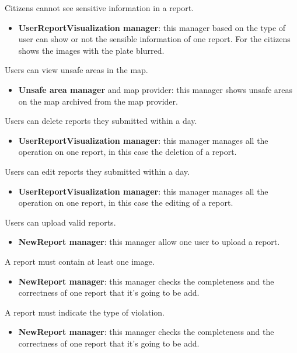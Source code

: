 \documentclass[../RASD.tex]{subfiles}
\begin{document}
\begin{enumerate}
         Citizens cannot see sensitive information in a report.
        \begin{itemize}
            \item \textbf{UserReportVisualization manager}: this manager based on the type of user can show or not the sensible information of one report.
            For the citizens shows the images with the plate blurred.
        \end{itemize}

         Users can view unsafe areas in the map.
        \begin{itemize}
            \item \textbf{Unsafe area manager} and map provider: this manager shows unsafe areas on the map archived from the map provider.
        \end{itemize}

         Users can delete reports they submitted within a day.
        \begin{itemize}
            \item \textbf{UserReportVisualization manager}: this manager manages all the operation on one report, in this case the deletion of a report.
        \end{itemize}

         Users can edit reports they submitted within a day.
        \begin{itemize}
            \item \textbf{UserReportVisualization manager}: this manager manages all the operation on one report, in this case the editing of a report.
        \end{itemize}

         Users can upload valid reports.
        \begin{itemize}
            \item \textbf{NewReport manager}: this manager allow one user to upload a report.
        \end{itemize}

         A report must contain at least one image.
        \begin{itemize}
            \item \textbf{NewReport manager}: this manager checks the completeness and the correctness of one report that it’s going to be add.
        \end{itemize}

         A report must indicate the type of violation.
        \begin{itemize}
            \item \textbf{NewReport manager}: this manager checks the completeness and the correctness of one report that it’s going to be add.
        \end{itemize}


\end{enumerate}
\end{document}
